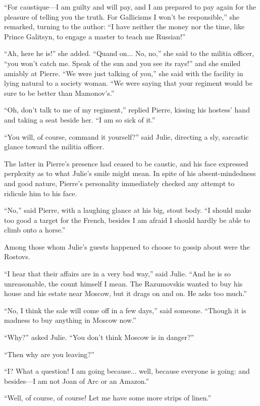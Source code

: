 ``For caustique---I am guilty and will pay, and I am prepared to
pay again for the pleasure of telling you the truth. For
Gallicisms I won't be responsible,'' she remarked, turning to the
author: ``I have neither the money nor the time, like Prince
Galitsyn, to engage a master to teach me Russian!''

``Ah, here he is!'' she added. ``Quand on... No, no,'' she said
to the militia officer, ``you won't catch me. Speak of the sun
and you see its rays!'' and she smiled amiably at Pierre. ``We
were just talking of you,'' she said with the facility in lying
natural to a society woman. ``We were saying that your regiment
would be sure to be better than Mamonov's.''

``Oh, don't talk to me of my regiment,'' replied Pierre, kissing
his hostess' hand and taking a seat beside her. ``I am so sick of
it.''

``You will, of course, command it yourself?'' said Julie,
directing a sly, sarcastic glance toward the militia officer.

The latter in Pierre's presence had ceased to be caustic, and his
face expressed perplexity as to what Julie's smile might mean. In
spite of his absent-mindedness and good nature, Pierre's
personality immediately checked any attempt to ridicule him to
his face.

``No,'' said Pierre, with a laughing glance at his big, stout
body. ``I should make too good a target for the French, besides I
am afraid I should hardly be able to climb onto a horse.''

Among those whom Julie's guests happened to choose to gossip
about were the Rostovs.

``I hear that their affairs are in a very bad way,'' said
Julie. ``And he is so unreasonable, the count himself I mean. The
Razumovskis wanted to buy his house and his estate near Moscow,
but it drags on and on. He asks too much.''

``No, I think the sale will come off in a few days,'' said
someone.  ``Though it is madness to buy anything in Moscow now.''

``Why?'' asked Julie. ``You don't think Moscow is in danger?''

``Then why are you leaving?''

``I? What a question! I am going because... well, because
everyone is going: and besides---I am not Joan of Arc or an
Amazon.''

``Well, of course, of course! Let me have some more strips of
linen.''


